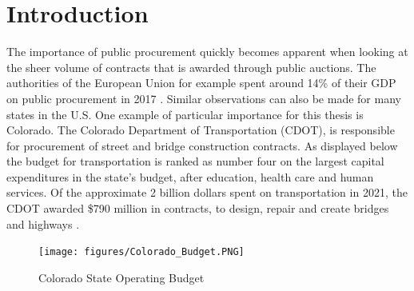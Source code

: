 \documentclass[a4paper,12pt, headsepline]{scrartcl}
\numberwithin{equation}{section}
\begin{document}
\section{Introduction}\label{sec:int}
The importance of public procurement quickly becomes apparent when looking at the sheer volume of contracts that is awarded through public auctions. The authorities of the European Union for example spent around 14\% of their GDP on public procurement in 2017 \citep{GarciaRodriguez2020}. Similar observations can also be made for many states in the U.S. One example of particular importance for this thesis is Colorado. The Colorado Department of Transportation (CDOT), is responsible for procurement of street and bridge construction contracts. As displayed below the budget for transportation is ranked as number four on the largest capital expenditures in the state's budget, after education, health care and human services. Of the approximate 2 billion dollars spent on transportation in 2021, the CDOT awarded \$790 million in contracts, to design, repair and create bridges and highways \citep{CDOTPRes}.

\begin{figure}[H]
	\texttt{[image: figures/Colorado\_Budget.PNG]}
	\caption{Colorado State Operating Budget \citep{ColoradoBudget}}\label{fig:bud}
\end{figure}
\end{document}
